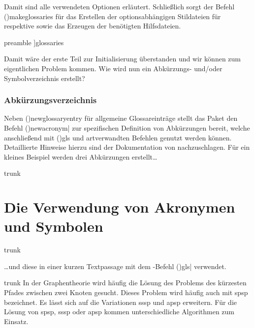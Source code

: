 \documentclass[%
  english,ngerman,%
  cdgeometry=no,DIV=12,%
  cd=false,cdfont=false,cdtitle=true,%
  headings=normal,%
  automark,%
  listof=toc,%
]{tudscrartcl}
\begin{document}
Damit sind alle verwendeten Optionen erläutert. Schließlich sorgt der Befehl 
\Macro(){makeglossaries} für das Erstellen der 
optionsabhängigen Stildateien für  respektive 
 sowie das Erzeugen der benötigten Hilfsdateien.
%
\begin{Code}{preamble}
]{glossaries}
\makeglossaries

\end{Code}

Damit wäre der erste Teil zur Initialisierung überstanden und wir können zum 
eigentlichen Problem kommen. Wie wird nun ein Abkürzungs- und/oder 
Symbolverzeichnis erstellt?



\subsubsection{Abkürzungsverzeichnis}

Neben \Macro(){newglossaryentry} für allgemeine 
Glossareinträge stellt das Paket  den Befehl 
\Macro(){newacronym|%
  \OList{}} 
zur spezifischen Definition von Abkürzungen bereit, welche anschließend mit 
\Macro(){gls} und artverwandten Befehlen 
genutzt werden können. Detaillierte Hinweise hierzu sind der Dokumentation von 
 nachzuschlagen. Für ein kleines Beispiel werden drei 
Abkürzungen erstellt\dots
%
\begin{Code}[nolst]{trunk}
\section{Die Verwendung von Akronymen und Symbolen}

\end{Code}
\CodeHook{\renewcommand*\newglossaryentry[2]{}}
\begin{Code}[input]{trunk}

\end{Code}

\dots und diese in einer kurzen Textpassage mit dem -Befehl
\Macro(){gls|} verwendet.
%
\begin{Code}[input]{trunk}
In der Graphentheorie wird häufig die Lösung des Problems des kürzesten
Pfades zwischen zwei Knoten gesucht. Dieses Problem wird häufig auch
mit \gls{spsp} bezeichnet. Es lässt sich auf die Variationen \gls{sssp}
und \gls{apsp} erweitern. Für die Lösung von \gls{spsp}, \gls{sssp} 
oder \gls{apsp} kommen unterschiedliche Algorithmen zum Einsatz.

\end{Code}
\end{document}
